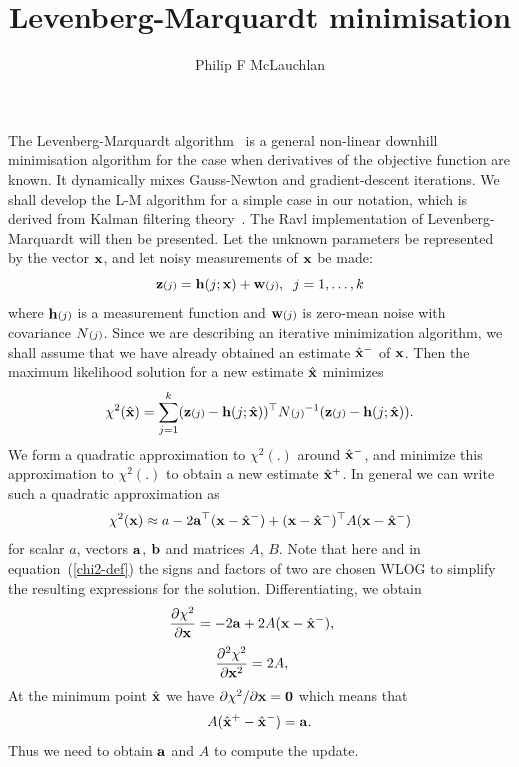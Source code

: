 \documentclass{article}
\title{Levenberg-Marquardt minimisation}
\author{Philip F McLauchlan}
\date{}
\begin{document}
\setcounter{tocdepth}{3}
\setcounter{secnumdepth}{3}

\maketitle

The Levenberg-Marquardt
algorithm~\cite{Marquardt:JSIAM63,Bjorck:96}
is a general non-linear downhill minimisation algorithm
for the case when derivatives of the objective function are known.
It dynamically mixes Gauss-Newton and gradient-descent iterations.
We shall develop the L-M algorithm for a simple
case in our notation, which is derived from Kalman filtering
theory~\cite{BarShalom:Fortmann:88}. The Ravl implementation of
Levenberg-Marquardt will then be presented. Let the unknown parameters be
represented by the vector ${\bf x}$, and let noisy measurements of
${\bf x}$ be made:
\begin{equation}
 {\bf z}{\scriptstyle (j)} = {\bf h}(j;{\bf x}) + {\bf w}{\scriptstyle (j)},\;\;j=1,\ldots,k
 \label{measure_equation}
\end{equation}
where ${\bf h}{\scriptstyle (j)}$ is a measurement function and ${\bf w}{\scriptstyle (j)}$ is zero-mean
noise with covariance $N{\scriptstyle (j)}$. Since we are describing an iterative
minimization algorithm, we shall assume that we have already obtained
an estimate $\hat{\bf x}^-$ of ${\bf x}$.
Then the maximum likelihood solution for a new estimate $\hat{\bf x}$ minimizes
\begin{equation}
 \chi^2(\hat{\bf x}) = \sum_{j=1}^k ({\bf z}{\scriptstyle (j)}-{\bf h}(j;\hat{\bf x}))^{\top} N{\scriptstyle (j)}^{-1} ({\bf z}{\scriptstyle (j)}-{\bf h}(j;\hat{\bf x})).
 \label{chi2-def}
\end{equation}
We form a quadratic approximation to $\chi^2(.)$ around $\hat{\bf x}^-$, and minimize
this approximation to $\chi^2(.)$ to obtain a new estimate $\hat{\bf x}^+$.
In general we can write such a quadratic approximation as
\[ \chi^2({\bf x}) \approx a - 2{\bf a}^{\top}({\bf x}-\hat{\bf x}^-) + ({\bf x}-\hat{\bf x}^-)^{\top} A ({\bf x}-\hat{\bf x}^-)
\]
for scalar $a$, vectors ${\bf a}$, ${\bf b}$ and matrices $A$, $B$.
Note that here and in equation~(\ref{chi2-def}) the signs and factors of two
are chosen WLOG to simplify the resulting expressions for the solution.
Differentiating, we obtain
\[
 \frac{\partial \chi^2}{\partial {\bf x}} = - 2{\bf a} + 2A({\bf x}-\hat{\bf x}^-), \;\;\;\;
\]
\[
 \frac{\partial^2 \chi^2}{\partial {\bf x}^2} = 2A, \;\;\;\;
\]
At the minimum point $\hat{\bf x}$ we have $\partial \chi^2/\partial {\bf x}={\bf 0}$
which means that
\begin{equation}
 A (\hat{\bf x}^+-\hat{\bf x}^-) = {\bf a}.
 \label{chi2-min}
\end{equation}
Thus we need to obtain ${\bf a}$ and $A$ to compute the update.
\end{document}
